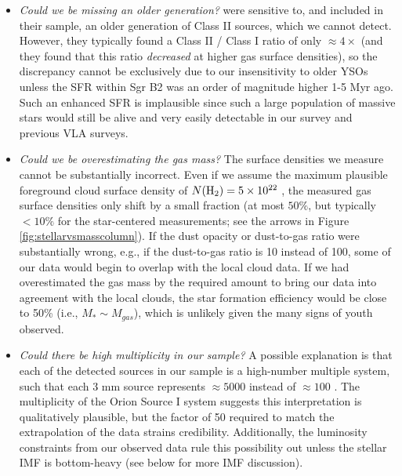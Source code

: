 \documentclass[twocolumn]{aastex61}
\begin{document}
\begin{itemize}
    \item \emph{Could we be missing an older generation?}
        \citet{Gutermuth2011a} were sensitive to, and included in their sample,
        an older generation of Class II sources, which we cannot detect.
        However, they typically found a Class II / Class I ratio of only
        $\approx4\times$ \citep{Gutermuth2009a} (and they found that this
        ratio \emph{decreased} at higher gas surface densities), so the
        discrepancy cannot be exclusively due to our insensitivity to older
        YSOs unless the SFR within Sgr B2 was an order of
        magnitude higher 1-5 Myr ago.  Such an enhanced SFR is implausible
        since such a large population of massive stars would still be alive and
        very easily detectable in our survey and previous VLA surveys. 

    \item \emph{Could we be overestimating the gas mass?}
        The surface densities we measure cannot be substantially incorrect.
        Even if we assume the maximum plausible foreground cloud surface
        density of $N(\textrm{H}_{2})=5\times10^{22}$ \persc, the measured gas surface densities
        only shift by a small fraction (at most $50\%$, but typically $<10\%$
        for the star-centered measurements; see the arrows in Figure
        \ref{fig:stellarvsmasscolumn}).
        If the dust opacity or dust-to-gas ratio were substantially wrong,
        e.g., if the dust-to-gas ratio is 10 instead of 100, some of
        our data would begin to overlap with the local cloud data.
        If we had overestimated the gas mass by the required amount to
        bring our data into agreement with the local clouds, the star
        formation efficiency would be close to 50\% (i.e., $M_*\sim M_{gas}$),
        which is unlikely given the many signs of youth observed.

    \item \emph{Could there be high multiplicity in our sample?} 
        A possible explanation is that each of the detected sources in our
        sample is a high-number multiple system, such that each 3 mm source
        represents $\approx5000$ \msun instead of $\approx100$ \msun.  The
        multiplicity of the Orion Source I system suggests this interpretation
        is qualitatively plausible, but the factor of 50 required to match the
        extrapolation of the \citet{Gutermuth2011a} data strains credibility.
        Additionally, the luminosity constraints from our observed data
        rule this possibility out unless the stellar IMF is bottom-heavy
        (see below for more IMF discussion).


\end{itemize}
\end{document}
